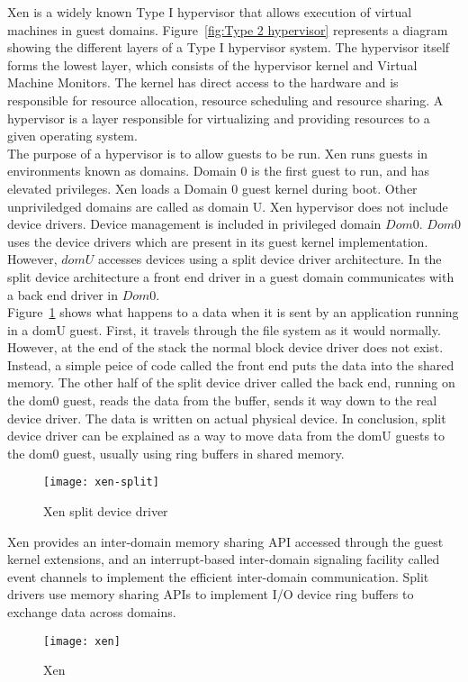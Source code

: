 Xen\cite{Barham:2003:XAV:1165389.945462} is a widely known Type I hypervisor that allows execution of virtual machines in guest domains\cite{King_operatingsystem}. Figure~\ref{fig:Type 2 hypervisor} represents a diagram showing the different layers of a Type I hypervisor system. The hypervisor itself forms the lowest layer, which consists of the hypervisor kernel and Virtual Machine Monitors. The kernel has direct access to the hardware and is responsible for resource allocation, resource scheduling and resource sharing. A hypervisor is a layer responsible for virtualizing and providing resources to a given operating system.
\\
The purpose of a hypervisor is to allow guests to be run. Xen runs guests in environments known as domains. Domain 0 is the first guest to run, and has elevated privileges. Xen loads a Domain 0 guest kernel during boot. Other unpriviledged domains are called as domain U. Xen hypervisor does not include device drivers. Device management is included in privileged domain $Dom 0$. $Dom 0$ uses the device drivers which are present in its guest kernel implementation. However, $dom U$ accesses devices using a split device driver architecture. In the split device architecture a front end driver in a guest domain communicates with a back end driver in $Dom 0$.
\\
Figure~\ref{xen-split2} shows what happens to a data when it is sent by an application running in a domU guest. First, it travels through the file system as it would normally. However, at the end of the stack the normal block device driver does not exist. Instead, a simple peice of code called the front end puts the data into the shared memory. The other half of the split device driver called the back end, running on the dom0 guest, reads the data from the buffer, sends it way down to the real device driver. The data is written on actual physical device. In conclusion, split device driver can be explained as a way to move data from the domU guests to the dom0 guest, usually using ring buffers in shared memory. \cite{Chisnall:2007:DGX:1407351}
\begin{figure}[!h]
\centering
\texttt{[image: xen-split]}
\caption{Xen split device driver}
\label{xen-split2}
\end{figure}

Xen provides an inter-domain memory sharing API accessed through the guest kernel extensions, and an interrupt-based inter-domain signaling facility called event channels to implement the efficient inter-domain communication. Split drivers use memory sharing APIs to implement I/O device ring buffers to exchange data across domains.
\\
\begin{figure}[!h]
\centering
\texttt{[image: xen]}
\caption{Xen}
\label{xen}
\end{figure}

